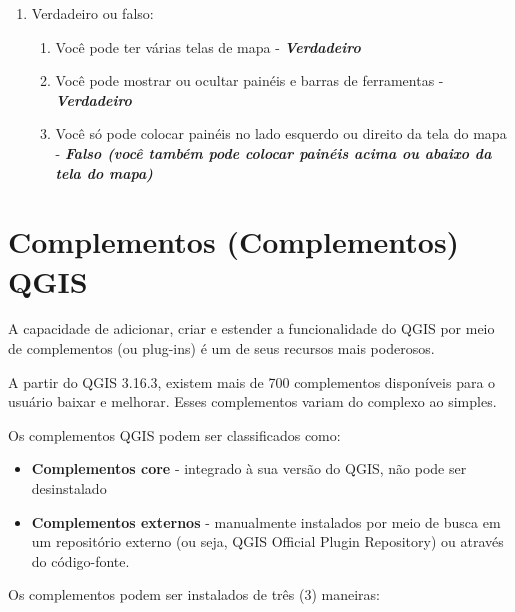 \documentclass[
  portuguese,
]{krantz}
\providecommand{\tightlist}{%
  \setlength{\itemsep}{0pt}\setlength{\parskip}{0pt}}
\begin{document}
\begin{enumerate}
\def\labelenumi{\arabic{enumi}.}
\tightlist
\item
  Verdadeiro ou falso:

  \begin{enumerate}
  \def\labelenumii{\arabic{enumii}.}
  \tightlist
  \item
    Você pode ter várias telas de mapa - \textbf{\emph{Verdadeiro}}
  \item
    Você pode mostrar ou ocultar painéis e barras de ferramentas - \textbf{\emph{Verdadeiro}}
  \item
    Você só pode colocar painéis no lado esquerdo ou direito da tela do mapa - \textbf{\emph{Falso (você também pode colocar painéis acima ou abaixo da tela do mapa)}}
  \end{enumerate}
\end{enumerate}

\hypertarget{complementos-complementos-qgis}{%
\section{Complementos (Complementos) QGIS}\label{complementos-complementos-qgis}}

A capacidade de adicionar, criar e estender a funcionalidade do QGIS por meio de complementos (ou plug-ins) é um de seus recursos mais poderosos.

A partir do QGIS 3.16.3, existem mais de 700 complementos disponíveis para o usuário baixar e melhorar. Esses complementos variam do complexo ao simples.

Os complementos QGIS podem ser classificados como:

\begin{itemize}
\tightlist
\item
  \textbf{Complementos core} - integrado à sua versão do QGIS, não pode ser desinstalado
\item
  \textbf{Complementos externos} - manualmente instalados por meio de busca em um repositório externo (ou seja, QGIS Official Plugin Repository) ou através do código-fonte.
\end{itemize}

Os complementos podem ser instalados de três (3) maneiras:
\end{document}
